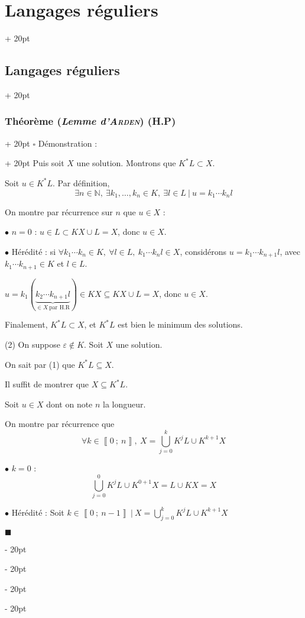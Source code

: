 \documentclass[a4paper, 12pt, twoside]{article}
\newcommand{\N}{\mathbb{N}} %
\newcommand{\nset}[2]{\left\llbracket #1\ ;\ #2 \right\rrbracket}
\newcommand{\ind}[1][20pt]{\advance\leftskip + #1}
\newcommand{\deind}[1][20pt]{\advance\leftskip - #1}
\newenvironment{indt}[2][20pt]{#2 \par \ind[#1]}{\par \deind} %
\newenvironment{proof}[1][{Démonstration :}]{\begin{indt}{$\square$ #1}}{$\blacksquare$ \end{indt}}
\begin{document}
\begin{indt}{\section{Langages réguliers}}
\begin{indt}{\subsection{Langages réguliers}}
\begin{indt}{\subsubsection{Théorème (\textit{Lemme d'\textsc{Arden}}) (H.P)}}
\begin{proof}
                    Puis soit $X$ une solution. Montrons que $K^* L \subset X$.

                    Soit $u \in K^* L$. Par définition,
                    \[
                        \exists n \in \N,\ \exists k_1, \ldots, k_n \in K,\ \exists l \in L\ |\
                        u = k_1 \cdots k_n l
                    \]

                    On montre par récurrence sur $n$ que $u \in X$ :

                    $\bullet$ $n = 0$ :
                    $u \in L \subset KX\cup L = X$, donc $u \in X$.

                    \vspace{6pt}
                    
                    $\bullet$ Hérédité :
                    si $\forall k_1 \cdots k_n \in K,\ \forall l \in L,\ k_1 \cdots k_n l \in X$, considérons $u = k_1 \cdots k_{n + 1} l$, avec $k_1 \cdots k_{n + 1} \in K$ et $l \in L$.

                    $u = k_1(\underbrace{k_2 \cdots k_{n + 1}l}_{\in X\ \text{par H.R}}) \in KX \subseteq KX \cup L = X$, donc $u \in X$.

                    Finalement, $K^* L \subset X$, et $K^*L$ est bien le minimum des solutions.

                    \vspace{12pt}
                    
                    (2) On suppose $\varepsilon \notin K$. Soit $X$ une solution.

                    On sait par (1) que $K^*L \subseteq X$.

                    Il suffit de montrer que $X \subseteq K^* L$.

                    Soit $u \in X$ dont on note $n$ la longueur.

                    On montre par récurrence que
                    \[
                        \forall k \in \nset 0 n,\ X = \bigcup_{j = 0}^k K^j L \cup K^{k + 1} X
                    \]

                    \vspace{6pt}
                    
                    $\bullet$ $k = 0$ :
                    \[
                        \bigcup_{j = 0}^0 K^j L \cup K^{0 + 1} X = L \cup KX = X
                    \]

                    $\bullet$ Hérédité : Soit $k \in \nset 0 {n - 1} \ |\ X = \displaystyle \bigcup_{j = 0}^k K^j L \cup K^{k + 1} X$


\end{proof}
\end{indt}
\end{indt}
\end{indt}
\end{document}
